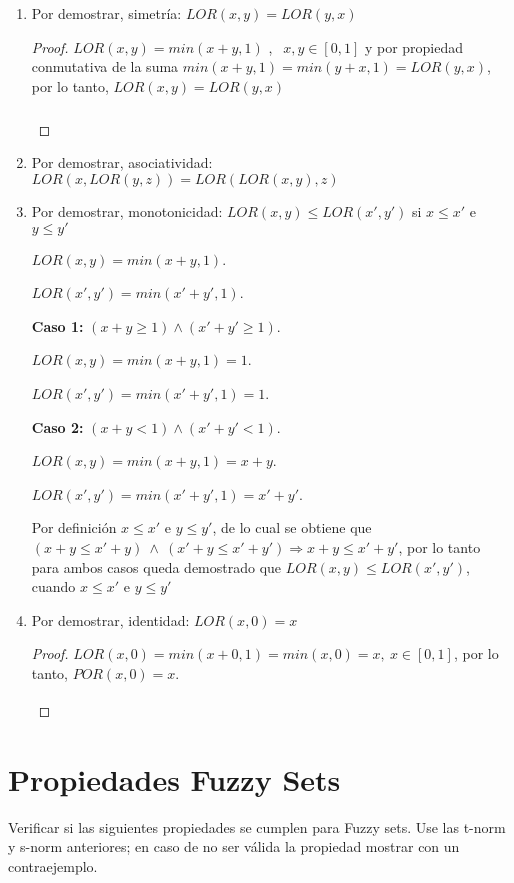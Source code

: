 \documentclass[letterpaper,spanish,11pt]{article}
\begin{document}
\begin{enumerate}
\item Por demostrar, simetr\'{i}a: $LOR(x,y)=LOR(y,x)$
\begin{proof}

$LOR(x,y)=min(x+y,1)$ , $\ \ x,y \in [0,1]$ y por propiedad conmutativa de la suma $min(x+y,1) = min(y+x,1)=LOR(y,x)$, por lo tanto, $LOR(x,y)=LOR(y,x)$

\[\qedhere\]
\end{proof}


\item Por demostrar, asociatividad: $LOR(x,LOR(y,z))=LOR(LOR(x,y),z)$


\item Por demostrar, monotonicidad: $LOR(x,y) \leq LOR(x',y')$ si $x\leq x'$ e $y\leq y'$

$LOR(x,y) = min (x+y,1)$.

$LOR(x',y') = min (x'+y',1)$.

\textbf{Caso 1:}  $(x + y \geq 1) \wedge (x'+y' \geq 1)$.

$LOR(x,y) = min (x+y,1)=1$.

$LOR(x',y') = min (x'+y',1)=1$.


\textbf{Caso 2:}  $(x + y < 1) \wedge (x'+y' < 1)$.

$LOR(x,y) = min (x+y,1)=x+y$.

$LOR(x',y') = min (x'+y',1)=x'+y'$.
 
Por definici\'{o}n $x\leq x'$ e $y\leq y' $, de lo cual se obtiene que  $(x + y \leq  x'+y) \ \wedge \  (x'+y \leq x'+y') \Rightarrow x + y \leq x'+y'$, por lo tanto para ambos casos queda demostrado que $LOR(x,y) \leq LOR(x',y')$, cuando  $x\leq x'$ e $y\leq y'$ 


\item Por demostrar, identidad: $LOR(x,0)=x$
\begin{proof}
$LOR(x,0)=min(x + 0,1)=min(x,0)=x, \ x \in [0,1]$, por lo tanto, $POR(x,0)=x$.
\[\qedhere\]
\end{proof}


\end{enumerate}


\section{Propiedades Fuzzy Sets}
Verificar si las siguientes propiedades se cumplen para Fuzzy sets. Use las t-norm y s-norm anteriores; en caso de no ser v\'{a}lida la propiedad mostrar con un contraejemplo.
\end{document}
